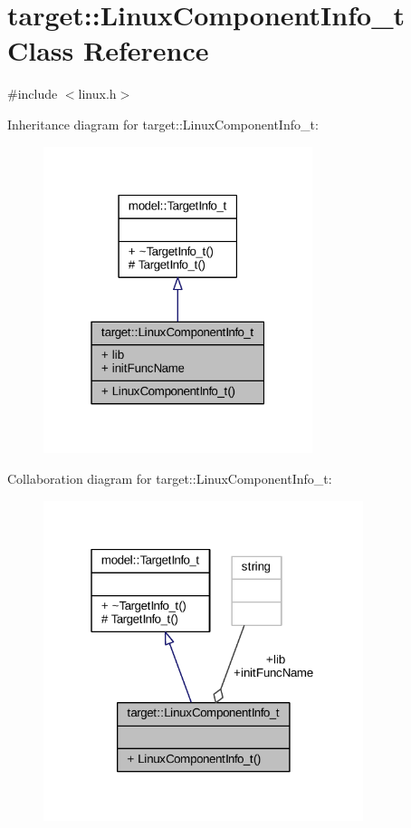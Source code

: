\hypertarget{classtarget_1_1_linux_component_info__t}{}\section{target\+:\+:Linux\+Component\+Info\+\_\+t Class Reference}
\label{classtarget_1_1_linux_component_info__t}


{\ttfamily \#include $<$linux.\+h$>$}



Inheritance diagram for target\+:\+:Linux\+Component\+Info\+\_\+t\+:
\nopagebreak
\begin{figure}[H]
\begin{center}
\leavevmode
\includegraphics[width=223pt]{classtarget_1_1_linux_component_info__t__inherit__graph}
\end{center}
\end{figure}


Collaboration diagram for target\+:\+:Linux\+Component\+Info\+\_\+t\+:
\nopagebreak
\begin{figure}[H]
\begin{center}
\leavevmode
\includegraphics[width=265pt]{classtarget_1_1_linux_component_info__t__coll__graph}
\end{center}
\end{figure}
